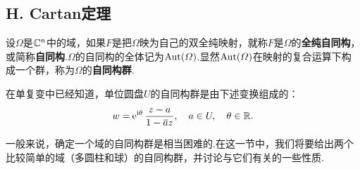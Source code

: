 \subsection{H. Cartan定理}
设$\Omega$是$\mathbb C^n$中的域，如果$F$是把$\Omega$映为自己的双全纯映射，就称$F$是$\Omega$的\textbf{全纯自同构}，或简称\textbf{自同构}.$\Omega$的自同构的全体记为$\operatorname{Aut}(\varOmega)$.显然$\operatorname{Aut}(\varOmega)$在映射的复合运算下构成一个群，称为$\Omega$的\textbf{自同构群}.

在单复变中已经知道，单位圆盘$U$的自同构群是由下述变换组成的：
\[w=\operatorname{\!\!\;\mathrm e}^{\mathrm i\theta}\frac{z-a}{1-{}\mkern1mu\overline{\mkern-1mua}z},\quad a\in U,\quad \theta\in\mathbb R.\]

一般来说，确定一个域的自同构群是相当困难的.在这一节中，我们将要给出两个比较简单的域（多圆柱和球）的自同构群，并讨论与它们有关的一些性质.

